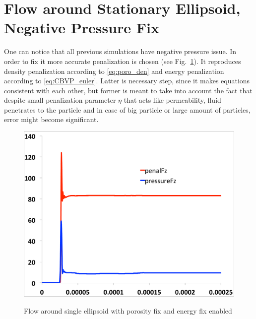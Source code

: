 \section{Flow around Stationary Ellipsoid, Negative Pressure Fix}
One can notice that all previous simulations have negative pressure issue. In order to fix it more accurate penalization is chosen (see Fig.~\ref{fig:lofi_single_fix}). It reproduces density penalization according to \eqref{eq:poro_den} and energy penalization according to \eqref{eq:CBVP_euler}. Latter is necessary step, since it makes equations consistent with each other, but former is meant to take into account the fact that despite small penalization parameter $\eta$ that acts like permeability, fluid penetrates to the particle and in case of big particle or large amount of particles, error might become significant.
\begin{figure}[h!]
\centering \includegraphics[scale=0.2]{fig/lofi_single_fix.pdf}\\
\caption{Flow around single ellipsoid with porosity fix and energy fix  enabled \label{fig:lofi_single_fix}}
\end{figure}